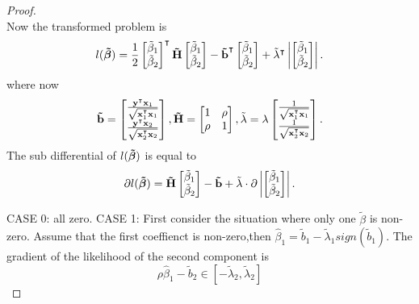 \begin{proof}
$$  $$
  Now the transformed problem is
  \[ l( {\boldsymbol{\mathrm{\tilde \beta }}}) =
    \frac 1 2 \begin{bmatrix}
      \tilde	\beta_1 \\ \tilde \beta_2
    \end{bmatrix}^\intercal   {\boldsymbol{\mathrm{ \tilde H}}} \begin{bmatrix}
      \tilde	\beta_1 \\  \tilde\beta_2
    \end{bmatrix}
    -  {\boldsymbol{\mathrm{\tilde b}}}^\intercal \begin{bmatrix}
      \tilde	\beta_1 \\ \tilde \beta_2
    \end{bmatrix} + {\tilde \lambda}^\intercal \left| \begin{bmatrix}
      \tilde	\beta_1 \\ \tilde \beta_2
    \end{bmatrix}  \right|.
  \]
  where now
  $$
    {\boldsymbol{\mathrm{ \tilde b}}} = \begin{bmatrix}
      \frac{{\boldsymbol{\mathrm{y}}}^\intercal {\boldsymbol{\mathrm{x}}}_1}{\sqrt{{\boldsymbol{\mathrm{x}}}_1^\intercal {\boldsymbol{\mathrm{x}}}_1}} \\ \frac{{\boldsymbol{\mathrm{y}}}^\intercal {\boldsymbol{\mathrm{x}}}_2}{\sqrt{{\boldsymbol{\mathrm{x}}}_2^\intercal {\boldsymbol{\mathrm{x}}}_2}}
    \end{bmatrix} , {\boldsymbol{\mathrm{ \tilde H}}}  =
    \begin{bmatrix}
      1    & \rho \\
      \rho & 1    \\
    \end{bmatrix}, \tilde \lambda  = \lambda  \begin{bmatrix}
      \frac{1}{\sqrt{{\boldsymbol{\mathrm{x}}}_1^\intercal {\boldsymbol{\mathrm{x}}}_1}} \\ \frac{1}{\sqrt{{\boldsymbol{\mathrm{x}}}_2^\intercal {\boldsymbol{\mathrm{x}}}_2}}
    \end{bmatrix} .
  $$
  The sub differential of $ l( {\boldsymbol{\mathrm{\tilde \beta }}}) $ is equal to
  $$
    \partial l( {\boldsymbol{\mathrm{\tilde \beta }}})  = {\boldsymbol{\mathrm{ \tilde H}}} \begin{bmatrix}
      \tilde	\beta_1 \\  \tilde\beta_2
    \end{bmatrix}  -   {\boldsymbol{\mathrm{\tilde b}}}  + {\tilde \lambda} \cdot \partial \left| \begin{bmatrix}
      \tilde	\beta_1 \\ \tilde \beta_2
    \end{bmatrix}  \right|.
  $$

  CASE 0: all zero.
  CASE 1:
  First consider the situation where only one $\tilde \beta$ is non-zero. Assume that the first coeffienct is non-zero,then $\hat \beta_1 =  \tilde b_1 -  {\tilde \lambda}_1 sign( \tilde b_1 )$. The gradient of the likelihood of the second component is
  $$
    \rho \hat \beta_1  -  \tilde b_2 \in [-\tilde \lambda_2,\tilde \lambda_2 ]
  $$
\end{proof}


